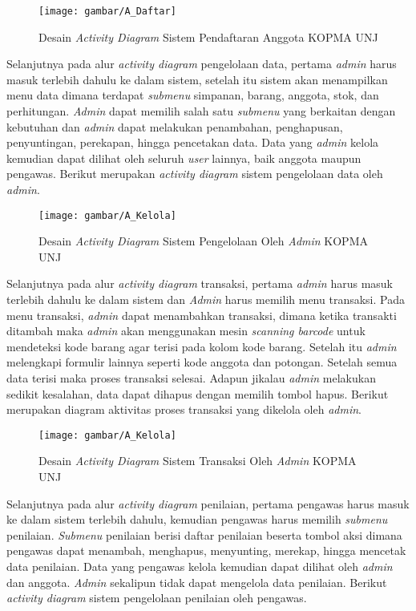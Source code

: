 \begin{figure}[H]
	\centering
	\texttt{[image: gambar/A\_Daftar]}
	\caption{Desain \emph{Activity Diagram} Sistem Pendaftaran Anggota KOPMA UNJ}
\end{figure}

Selanjutnya pada alur \emph{activity diagram} pengelolaan data, pertama \emph{admin} harus masuk terlebih dahulu ke dalam sistem, setelah itu sistem akan menampilkan menu data dimana terdapat \emph{submenu} simpanan, barang, anggota, stok, dan perhitungan. \emph{Admin} dapat memilih salah satu \emph{submenu} yang berkaitan dengan kebutuhan dan \emph{admin} dapat melakukan penambahan, penghapusan, penyuntingan, perekapan, hingga pencetakan data. Data yang \textit{admin} kelola kemudian dapat dilihat oleh seluruh \textit{user} lainnya, baik anggota maupun pengawas. Berikut merupakan \textit{activity diagram} sistem pengelolaan data oleh \textit{admin}.

\begin{figure}[H]
	\centering
	\texttt{[image: gambar/A\_Kelola]}
	\caption{Desain \emph{Activity Diagram} Sistem Pengelolaan Oleh \emph{Admin} KOPMA UNJ}
\end{figure}

Selanjutnya pada alur \emph{activity diagram} transaksi, pertama \emph{admin} harus masuk terlebih dahulu ke dalam sistem dan \emph{Admin} harus memilih menu transaksi. Pada menu transaksi, \textit{admin} dapat menambahkan transaksi, dimana ketika transakti ditambah maka \textit{admin} akan menggunakan mesin \textit{scanning barcode} untuk mendeteksi kode barang agar terisi pada kolom kode barang. Setelah itu \textit{admin} melengkapi formulir lainnya seperti kode anggota dan potongan. Setelah semua data terisi maka proses transaksi selesai. Adapun jikalau \textit{admin} melakukan sedikit kesalahan, data dapat dihapus dengan memilih tombol hapus. Berikut merupakan diagram aktivitas proses transaksi yang dikelola oleh \textit{admin}.

\begin{figure}[H]
	\centering
	\texttt{[image: gambar/A\_Kelola]}
	\caption{Desain \emph{Activity Diagram} Sistem Transaksi Oleh \emph{Admin} KOPMA UNJ}
\end{figure}

Selanjutnya pada alur \emph{activity diagram} penilaian, pertama pengawas harus masuk ke dalam sistem terlebih dahulu, kemudian pengawas harus memilih \emph{submenu} penilaian. \emph{Submenu} penilaian berisi daftar penilaian beserta tombol aksi dimana pengawas dapat menambah, menghapus, menyunting, merekap, hingga mencetak data penilaian. Data yang pengawas kelola kemudian dapat dilihat oleh \textit{admin} dan anggota. \textit{Admin} sekalipun tidak dapat mengelola data penilaian. Berikut \textit{activity diagram} sistem pengelolaan penilaian oleh pengawas.

